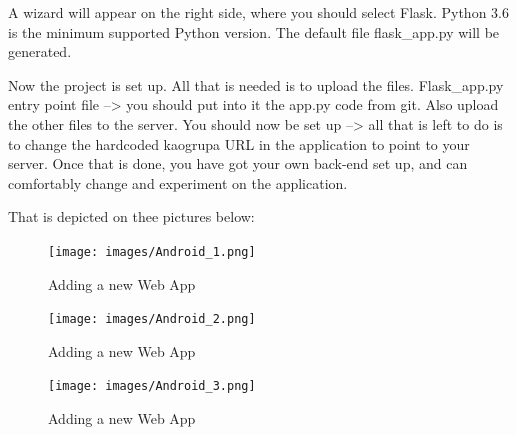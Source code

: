 				A wizard will appear on the right side, where you should select Flask. Python 3.6 is the minimum supported Python version. The default file flask_app.py will be generated. 
				
				Now the project is set up. All that is needed is to upload the files. Flask_app.py entry point file --> you should put into it the app.py code from git. Also upload the other files to the server. You should now be set up --> all that is left to do is to change the hardcoded kaogrupa URL in the application to point to your server. Once that is done, you have got your own back-end set up, and can comfortably change and experiment on the application.
				
				That is depicted on thee pictures below:
				\begin{figure}[H]
					\texttt{[image: images/Android\_1.png]}
					\caption{Adding a new Web App}
					\label{fig:android_1}
				\end{figure}
			
				\begin{figure}[H]
					\texttt{[image: images/Android\_2.png]}
					\caption{Adding a new Web App}
					\label{fig:android_2}
				\end{figure}
			
				\begin{figure}[H]
					\texttt{[image: images/Android\_3.png]}
					\caption{Adding a new Web App}
					\label{fig:android_3}
				\end{figure}
			
			\eject 